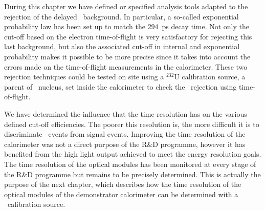 During this chapter we have defined or specified analysis tools adapted to the rejection of the delayed \Tl\ background.
In particular, a so-called exponential probability law has been set up to match the $294$~ps decay time.
Not only the cut-off based on the electron time-of-flight is very satisfactory for rejecting this last background, but also the associated cut-off in internal and exponential probability makes it possible to be more precise since it takes into account the errors made on the time-of-flight measurements in the calorimeter.
These two rejection techniques could be tested on site using a $^{232}$U calibration source, a parent of \Tl\ nucleus, set inside the calorimeter to check the \Tl\ rejection using time-of-flight.

We have determined the influence that the time resolution has on the various defined cut-off efficiencies.
The poorer this resolution is, the more difficult it is to discriminate \Tl\ events from signal events.
Improving the time resolution of the calorimeter was not a direct purpose of the R\&D programme, however it has benefited from the high light output achieved to meet the energy resolution goals.
The time resolution of the optical modules has been monitored at every stage of the R\&D programme but remains to be precisely determined.
This is actually the purpose of the next chapter, which describes how the time resolution of the optical modules of the demonstrator calorimeter can be determined with a \Co\ calibration source.
